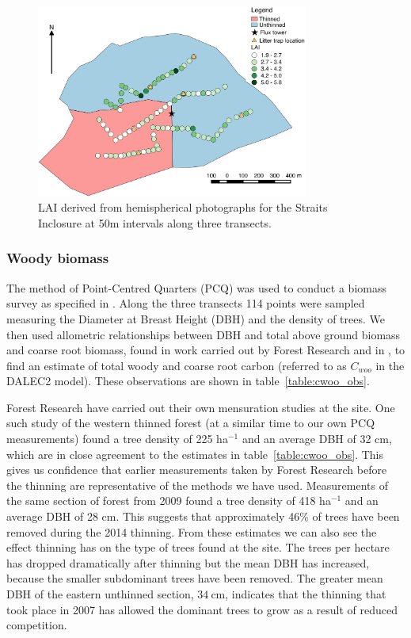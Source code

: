 \begin{figure}[ht]
    \centering
    \includegraphics[width=0.8\textwidth]{chapter/chapter7/thinned.pdf}
    \caption{LAI derived from hemispherical photographs for the Straits Inclosure at 50m intervals along three transects.} \label{fig:hemi_lai}
\end{figure}

\subsubsection{Woody biomass}  
The method of Point-Centred Quarters (PCQ) was used to conduct a biomass survey as specified in \citet{dahdouh2006empirical}. Along the three transects 114 points were sampled measuring the Diameter at Breast Height (DBH) and the density of trees. We then used allometric relationships between DBH and total above ground biomass and coarse root biomass, found in work carried out by Forest Research and in \citet{mckay2003woodfuel}, to find an estimate of total woody and coarse root carbon (referred to as \(C_{woo}\) in the DALEC2 model). These observations are shown in table~\ref{table:cwoo_obs}.

Forest Research have carried out their own mensuration studies at the site. One such study of the western thinned forest (at a similar time to our own PCQ measurements) found a tree density of 225 ha\(^{-1}\) and an average DBH of 32 cm, which are in close agreement to the estimates in table~\ref{table:cwoo_obs}. This gives us confidence that earlier measurements taken by Forest Research before the thinning are representative of the methods we have used. Measurements of the same section of forest from 2009 found a tree density of 418 ha\(^{-1}\) and an average DBH of 28 cm. This suggests that approximately 46\% of trees have been removed during the 2014 thinning. From these estimates we can also see the effect thinning has on the type of trees found at the site. The trees per hectare has dropped dramatically after thinning but the mean DBH has increased, because the smaller subdominant trees have been removed. The greater mean DBH of the eastern unthinned section, \(34~\text{cm}\), indicates that the thinning that took place in 2007 has allowed the dominant trees to grow as a result of reduced competition.


